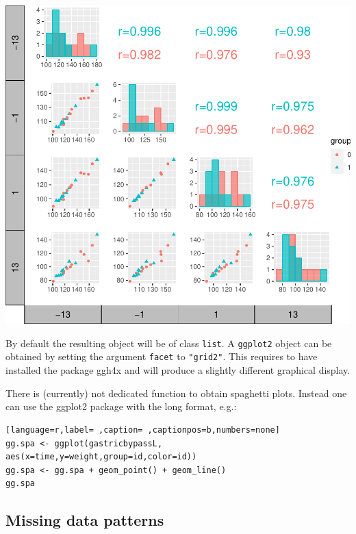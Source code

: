 \documentclass[12pt]{article}
\begin{document}
\begin{minipage}{0.48\linewidth}
\begin{center}
\includegraphics[trim={0 0 0 0},width=\textwidth]{./figures/scatterplot-group.pdf}
\end{center}
\end{minipage}


\bigskip

By default the resulting object will be of class \texttt{list}. A \texttt{ggplot2}
object can be obtained by setting the argument \texttt{facet} to
\texttt{"grid2"}. This requires to have installed the package ggh4x and will
produce a slightly different graphical display.

\bigskip

There is (currently) not dedicated function to obtain spaghetti
plots. Instead one can use the ggplot2 package with the long format, e.g.:
\begin{lstlisting}[language=r,label= ,caption= ,captionpos=b,numbers=none]
gg.spa <- ggplot(gastricbypassL, aes(x=time,y=weight,group=id,color=id))
gg.spa <- gg.spa + geom_point() + geom_line()
gg.spa
\end{lstlisting}

\clearpage

\subsection{Missing data patterns}
\label{sec:org8798c5b}
\end{document}
